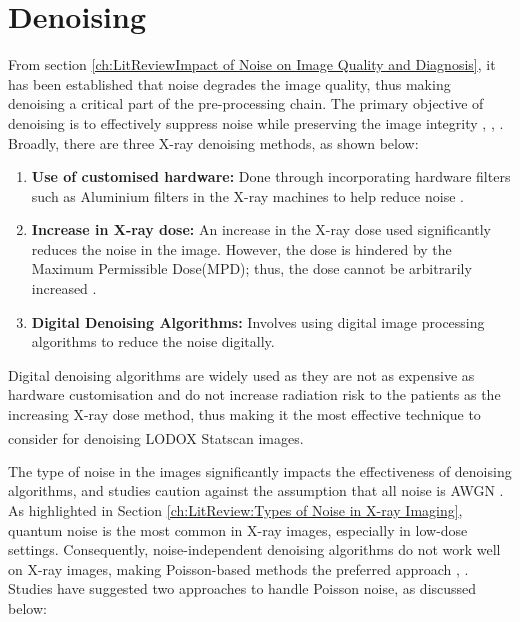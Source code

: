 \section{Denoising}
From section \ref{ch:LitReviewImpact of Noise on Image Quality and Diagnosis}, it has been established that noise degrades the image quality, thus making denoising a critical part of the pre-processing chain. The primary objective of denoising is to effectively suppress noise while preserving the image integrity \cite{juneja_denoising_2024},  \cite{lahmiri_iterative_2017}, \cite{kumar_noise_2017}. Broadly, there are three X-ray denoising methods, as shown below:

\begin{enumerate}
    \item \textbf{Use of customised hardware:} Done through incorporating hardware filters such as Aluminium filters in the X-ray machines to help reduce noise \cite{lee_impact_2022}.
    \item \textbf{Increase in X-ray dose:} An increase in the X-ray dose used significantly reduces the noise in the image. However, the dose is hindered by the Maximum Permissible Dose(MPD); thus, the dose cannot be arbitrarily increased \cite{kirti_poisson_2017}.
    \item \textbf{Digital Denoising Algorithms:} Involves using digital image processing algorithms to reduce the noise digitally.
\end{enumerate}

Digital denoising algorithms are widely used as they are not as expensive as hardware customisation and do not increase radiation risk to the patients as the increasing X-ray dose method, thus making it the most effective technique to consider for denoising LODOX\textsuperscript{\textregistered} Statscan\textsuperscript{\textregistered} images. 

The type of noise in the images significantly impacts the effectiveness of denoising algorithms, and studies caution against the assumption that all noise is \gls{AWGN} \cite{kirti_poisson_2017}. As highlighted in Section \ref{ch:LitReview:Types of Noise in X-ray Imaging}, quantum noise is the most common in X-ray images, especially in low-dose settings. Consequently, noise-independent denoising algorithms do not work well on X-ray images, making Poisson-based methods the preferred approach \cite{thanh_review_2019}, \cite{kipele_poisson_2023}. Studies have suggested two approaches to handle Poisson noise, as discussed below:

